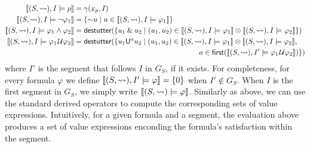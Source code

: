 \scriptsize
\begin{align*}
	\llbracket (S, {\hb}), I \models p \rrbracket &= \gamma(x_p, I) \\
	\llbracket (S, {\hb}), I \models \lnot \varphi_1 \rrbracket &= \{\BitNeg u \st u \in  \llbracket (S, {\hb}), I \models \varphi_1 \rrbracket \} \\
	\llbracket (S, {\hb}), I \models \varphi_1 \land \varphi_2 \rrbracket &= \destutter(\{ u_1 \BitAnd u_2 \st (u_1, u_2) \in \llbracket (S, {\hb}), I \models \varphi_1 \rrbracket \otimes \llbracket (S, {\hb}), I \models \varphi_2 \rrbracket  \}) \\
	\llbracket (S, {\hb}), I \models \varphi_1 \until \varphi_2 \rrbracket &= \destutter(\{ u_1 \mathsf{U}^a u_2 \st (u_1, u_2) \in \llbracket (S, {\hb}), I \models \varphi_1 \rrbracket \otimes \llbracket (S, {\hb}), I \models \varphi_2 \rrbracket, \\
	 &\hspace{17em} a \in \first(\llbracket (S, {\hb}), I' \models \varphi_1 \until \varphi_2 \rrbracket) \})
\end{align*}
\normalsize
where $I'$ is the segment that follows $I$ in $G_S$, if it exists.
For completeness, for every formula $\varphi$ we define $\llbracket (S, {\rightsquigarrow}), I' \models \varphi \rrbracket = \{0\}$ when $I' \notin G_S$.
When $I$ is the first segment in $G_S$, we simply write $\llbracket (S, {\rightsquigarrow}) \models \varphi \rrbracket$.
Similarly as above, we can use the standard derived operators to compute the corresponding sets of value expressions.
Intuitively, for a given formula and a segment, the evaluation above produces a set of value expressions enconding the formula's satisfaction within the segment.

